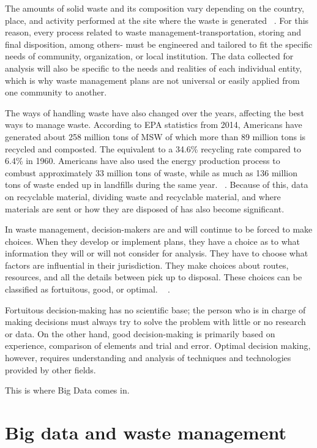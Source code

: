 \documentclass[sigconf]{acmart}
\begin{document}
The amounts of solid waste and its composition vary depending on the country, place, and activity performed at the site where the waste is generated ~\cite{chandrappa2012}. For this reason, every process related to waste management-transportation, storing and final disposition, among others- must be engineered and tailored to fit the specific needs of community, organization, or local institution.  The data collected for analysis will also be specific to the needs and realities of each individual entity, which is why waste management plans are not universal or easily applied from one community to another.  

The ways of handling waste have also changed over the years, affecting the best ways to manage waste. According to EPA statistics from 2014, Americans have generated about 258 million tons of MSW of which more than 89 million tons is recycled and composted. The equivalent to a 34.6\% recycling rate compared to 6.4\% in 1960. Americans have also used the energy production process to combust approximately 33 million tons of waste,  while as much as 136 million tons of waste ended up in landfills during the same year. ~\cite{epa2014}.  Because of this, data on recyclable material, dividing waste and recyclable material, and where materials are sent or how they are disposed of has also become significant.  

In waste management, decision-makers are and will continue to be forced to make choices.  When they develop or implement plans, they have a choice as to what information they will or will not consider for analysis.  They have to choose what factors are influential in their jurisdiction.  They make choices about routes, resources, and all the details between pick up to disposal.  These choices can be classified as fortuitous, good, or optimal. ~\cite{akbarpour2016} .

Fortuitous decision-making has no scientific base; the person who is in charge of making decisions must always try to solve the problem with little or no research or data.   On the other hand, good decision-making is primarily based on experience, comparison of elements and trial and error.  Optimal decision making, however, requires understanding and analysis of techniques and technologies provided by other fields.   ~\cite{akbarpour2016} 

This is where Big Data comes in. 

\section{ Big data and waste management}
\end{document}
